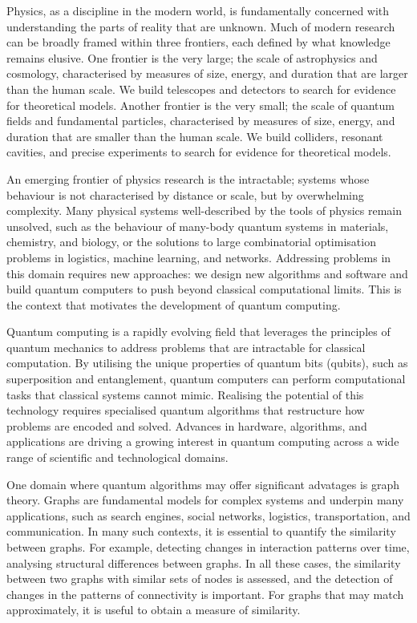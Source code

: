 Physics, as a discipline in the modern world, is fundamentally concerned with understanding the parts of reality that are unknown. Much of modern research can be broadly framed within three frontiers, each defined by what knowledge remains elusive. 
One frontier is the very large; the scale of astrophysics and cosmology, characterised by measures of size, energy, and duration that are larger than the human scale. We build telescopes and detectors to search for evidence for theoretical models. 
Another frontier is the very small; the scale of quantum fields and fundamental particles, characterised by measures of size, energy, and duration that are smaller than the human scale. We build colliders, resonant cavities, and precise experiments to search for evidence for theoretical models. 

An emerging frontier of physics research is the intractable; systems whose behaviour is not characterised by distance or scale, but by overwhelming complexity. Many physical systems well-described by the tools of physics remain unsolved, such as the behaviour of many-body quantum systems in materials, chemistry, and biology, or the solutions to large combinatorial optimisation problems in logistics, machine learning, and networks. Addressing problems in this domain requires new approaches: we design new algorithms and software and build quantum computers to push beyond classical computational limits. This is the context that motivates the development of quantum computing.

Quantum computing is a rapidly evolving field that leverages the principles of quantum mechanics to address problems that are intractable for classical computation. By utilising the unique properties of quantum bits (qubits), such as superposition and entanglement, quantum computers can perform computational tasks that classical systems cannot mimic. Realising the potential of this technology requires specialised quantum algorithms that restructure how problems are encoded and solved. Advances in hardware, algorithms, and applications are driving a growing interest in quantum computing across a wide range of scientific and technological domains.

One domain where quantum algorithms may offer significant advatages is graph theory.  Graphs are fundamental models for complex systems and underpin many applications, such as search engines, social networks, logistics, transportation, and communication. In many such contexts, it is essential to quantify the similarity between graphs.
For example, detecting changes in interaction patterns over time, analysing structural differences between graphs.
In all these cases, the similarity between two graphs with similar sets of nodes is assessed, and the detection of changes in the patterns of connectivity is important. For graphs that may match approximately, it is useful to obtain a measure of similarity.

